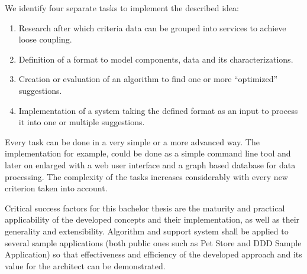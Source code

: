 We identify four separate tasks to implement the described idea:
\begin{enumerate}
	\item Research after which criteria data can be grouped into services to achieve loose coupling.
	\item Definition of a format to model components, data and its characterizations.
	\item Creation or evaluation of an algorithm to find one or more \enquote{optimized} suggestions.
	\item Implementation of a system taking the defined format as an input to process it into one or multiple suggestions.
\end{enumerate}
Every task can be done in a very simple or a more advanced way. The implementation for example, could be done as a simple command line tool and later on enlarged with a web user interface and a graph based database for data processing. The complexity of the tasks increases considerably with every new criterion taken into account.

Critical success factors for this bachelor thesis are the maturity and practical applicability of the developed concepts and their implementation, as well as their generality and extensibility.  Algorithm and support system shall be applied to several sample applications (both public ones such as Pet Store and DDD Sample Application) so that effectiveness and efficiency of the developed approach and its value for the architect can be demonstrated. 
